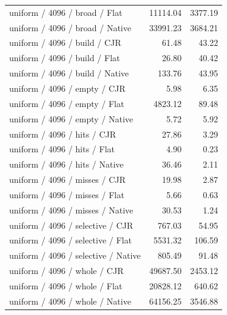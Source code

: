 \begin{longtable}{p{}rr}
uniform / 4096 / broad / Flat & 11114.04 & 3377.19 \\
uniform / 4096 / broad / Native & 33991.23 & 3684.21 \\
uniform / 4096 / build / CJR & 61.48 & 43.22 \\
uniform / 4096 / build / Flat & 26.80 & 40.42 \\
uniform / 4096 / build / Native & 133.76 & 43.95 \\
uniform / 4096 / empty / CJR & 5.98 & 6.35 \\
uniform / 4096 / empty / Flat & 4823.12 & 89.48 \\
uniform / 4096 / empty / Native & 5.72 & 5.92 \\
uniform / 4096 / hits / CJR & 27.86 & 3.29 \\
uniform / 4096 / hits / Flat & 4.90 & 0.23 \\
uniform / 4096 / hits / Native & 36.46 & 2.11 \\
uniform / 4096 / misses / CJR & 19.98 & 2.87 \\
uniform / 4096 / misses / Flat & 5.66 & 0.63 \\
uniform / 4096 / misses / Native & 30.53 & 1.24 \\
uniform / 4096 / selective / CJR & 767.03 & 54.95 \\
uniform / 4096 / selective / Flat & 5531.32 & 106.59 \\
uniform / 4096 / selective / Native & 805.49 & 91.48 \\
uniform / 4096 / whole / CJR & 49687.50 & 2453.12 \\
uniform / 4096 / whole / Flat & 20828.12 & 640.62 \\
uniform / 4096 / whole / Native & 64156.25 & 3546.88 \\
\end{longtable}
